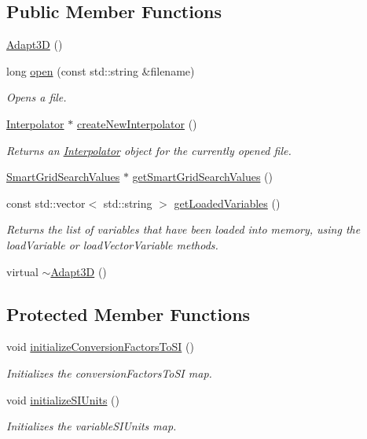 \subsection*{Public Member Functions}
\begin{DoxyCompactItemize}
\item 
\hyperlink{classccmc_1_1_adapt3_d_aa3927c68c63cde9e4006c0f8687116cb}{Adapt3\-D} ()
\item 
long \hyperlink{classccmc_1_1_adapt3_d_a02a5f2b5ba26cacd93f7c41c68c4b24a}{open} (const std\-::string \&filename)
\begin{DoxyCompactList}\small\item\em Opens a file. \end{DoxyCompactList}\item 
\hyperlink{classccmc_1_1_interpolator}{Interpolator} $\ast$ \hyperlink{classccmc_1_1_adapt3_d_a4a82029cb4669a788c7ffa555fa4c20f}{create\-New\-Interpolator} ()
\begin{DoxyCompactList}\small\item\em Returns an \hyperlink{classccmc_1_1_interpolator}{Interpolator} object for the currently opened file. \end{DoxyCompactList}\item 
\hyperlink{structccmc_1_1_smart_grid_search_values}{Smart\-Grid\-Search\-Values} $\ast$ \hyperlink{classccmc_1_1_adapt3_d_aba33c6663d647dc3d00e9007c909a7ed}{get\-Smart\-Grid\-Search\-Values} ()
\item 
const std\-::vector$<$ std\-::string $>$ \hyperlink{classccmc_1_1_adapt3_d_a0e69d88334151e8ac9b2cbb7dc546e64}{get\-Loaded\-Variables} ()
\begin{DoxyCompactList}\small\item\em Returns the list of variables that have been loaded into memory, using the load\-Variable or load\-Vector\-Variable methods. \end{DoxyCompactList}\item 
virtual \hyperlink{classccmc_1_1_adapt3_d_ac27c4556b1091bf63e5931ecadb37462}{$\sim$\-Adapt3\-D} ()
\end{DoxyCompactItemize}
\subsection*{Protected Member Functions}
\begin{DoxyCompactItemize}
\item 
void \hyperlink{classccmc_1_1_adapt3_d_aa4f0803514d069d146fdf58691b82d7a}{initialize\-Conversion\-Factors\-To\-S\-I} ()
\begin{DoxyCompactList}\small\item\em Initializes the conversion\-Factors\-To\-S\-I map. \end{DoxyCompactList}\item 
void \hyperlink{classccmc_1_1_adapt3_d_a00d25fcceb69cc274df1c5e671f620e5}{initialize\-S\-I\-Units} ()
\begin{DoxyCompactList}\small\item\em Initializes the variable\-S\-I\-Units map. \end{DoxyCompactList}\end{DoxyCompactItemize}
